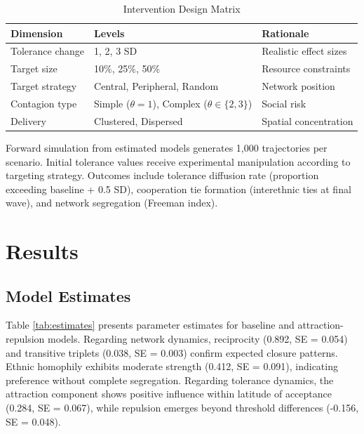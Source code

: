 \documentclass[12pt,a4paper]{article}
\begin{document}
\begin{table}[h]
\centering
\caption{Intervention Design Matrix}
\label{tab:design}
\begin{tabular}{lll}
\toprule
Dimension & Levels & Rationale \\
\midrule
Tolerance change & 1, 2, 3 SD & Realistic effect sizes \\
Target size & 10\%, 25\%, 50\% & Resource constraints \\
Target strategy & Central, Peripheral, Random & Network position \\
Contagion type & Simple ($\theta=1$), Complex ($\theta \in \{2,3\}$) & Social risk \\
Delivery & Clustered, Dispersed & Spatial concentration \\
\bottomrule
\end{tabular}
\end{table}

Forward simulation from estimated models generates 1,000 trajectories per scenario. Initial tolerance values receive experimental manipulation according to targeting strategy. Outcomes include tolerance diffusion rate (proportion exceeding baseline + 0.5 SD), cooperation tie formation (interethnic ties at final wave), and network segregation (Freeman index).


\section{Results}

\subsection{Model Estimates}

Table \ref{tab:estimates} presents parameter estimates for baseline and attraction-repulsion models. Regarding network dynamics, reciprocity (0.892, SE = 0.054) and transitive triplets (0.038, SE = 0.003) confirm expected closure patterns. Ethnic homophily exhibits moderate strength (0.412, SE = 0.091), indicating preference without complete segregation. Regarding tolerance dynamics, the attraction component shows positive influence within latitude of acceptance (0.284, SE = 0.067), while repulsion emerges beyond threshold differences (-0.156, SE = 0.048).
\end{document}
